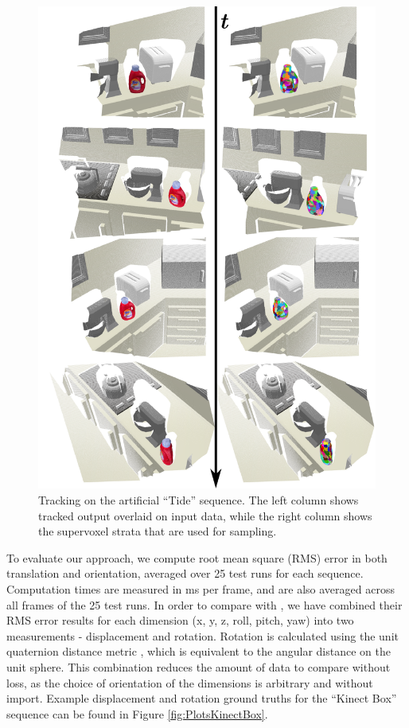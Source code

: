\begin{figure}[!t]
  \centering
  \includegraphics[width=1.06\linewidth]{figures/Tracking/TideMontage.pdf}
  \caption[Tracking on the artificial ``Tide'' sequence.]{Tracking on the artificial ``Tide'' sequence. The left column shows tracked output overlaid on input data, while the right column shows the supervoxel strata that are used for sampling.}
  \label{fig:TideMontage}
\end{figure}


To evaluate our approach, we compute root mean square (RMS) error in both translation and orientation, averaged over 25 test runs for each sequence. Computation times are measured in ms per frame, and are also averaged across all frames of the 25 test runs. In order to compare with \cite{Choi_IROS2013}, we have combined their RMS error results for each dimension (x, y, z, roll, pitch, yaw) into two measurements - displacement and rotation. Rotation is calculated using the unit quaternion distance metric \cite{Kuffner_ICRA2004}, which is equivalent to the angular distance on the unit sphere. This combination reduces the amount of data to compare without loss, as the choice of orientation of the dimensions is arbitrary and without import. Example displacement and rotation ground truths for the ``Kinect Box'' sequence can be found in Figure \ref{fig:PlotsKinectBox}.

